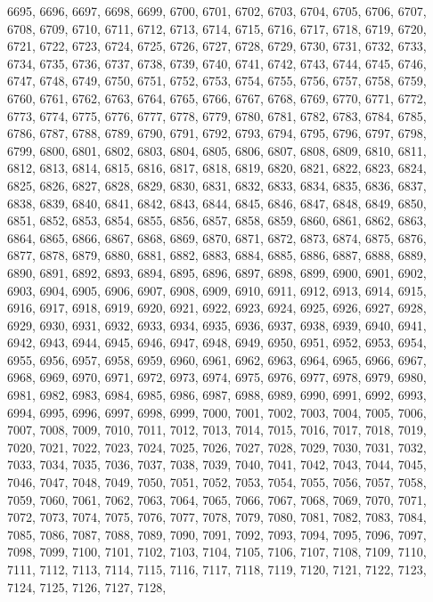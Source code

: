 6695,
6696,
6697,
6698,
6699,
6700,
6701,
6702,
6703,
6704,
6705,
6706,
6707,
6708,
6709,
6710,
6711,
6712,
6713,
6714,
6715,
6716,
6717,
6718,
6719,
6720,
6721,
6722,
6723,
6724,
6725,
6726,
6727,
6728,
6729,
6730,
6731,
6732,
6733,
6734,
6735,
6736,
6737,
6738,
6739,
6740,
6741,
6742,
6743,
6744,
6745,
6746,
6747,
6748,
6749,
6750,
6751,
6752,
6753,
6754,
6755,
6756,
6757,
6758,
6759,
6760,
6761,
6762,
6763,
6764,
6765,
6766,
6767,
6768,
6769,
6770,
6771,
6772,
6773,
6774,
6775,
6776,
6777,
6778,
6779,
6780,
6781,
6782,
6783,
6784,
6785,
6786,
6787,
6788,
6789,
6790,
6791,
6792,
6793,
6794,
6795,
6796,
6797,
6798,
6799,
6800,
6801,
6802,
6803,
6804,
6805,
6806,
6807,
6808,
6809,
6810,
6811,
6812,
6813,
6814,
6815,
6816,
6817,
6818,
6819,
6820,
6821,
6822,
6823,
6824,
6825,
6826,
6827,
6828,
6829,
6830,
6831,
6832,
6833,
6834,
6835,
6836,
6837,
6838,
6839,
6840,
6841,
6842,
6843,
6844,
6845,
6846,
6847,
6848,
6849,
6850,
6851,
6852,
6853,
6854,
6855,
6856,
6857,
6858,
6859,
6860,
6861,
6862,
6863,
6864,
6865,
6866,
6867,
6868,
6869,
6870,
6871,
6872,
6873,
6874,
6875,
6876,
6877,
6878,
6879,
6880,
6881,
6882,
6883,
6884,
6885,
6886,
6887,
6888,
6889,
6890,
6891,
6892,
6893,
6894,
6895,
6896,
6897,
6898,
6899,
6900,
6901,
6902,
6903,
6904,
6905,
6906,
6907,
6908,
6909,
6910,
6911,
6912,
6913,
6914,
6915,
6916,
6917,
6918,
6919,
6920,
6921,
6922,
6923,
6924,
6925,
6926,
6927,
6928,
6929,
6930,
6931,
6932,
6933,
6934,
6935,
6936,
6937,
6938,
6939,
6940,
6941,
6942,
6943,
6944,
6945,
6946,
6947,
6948,
6949,
6950,
6951,
6952,
6953,
6954,
6955,
6956,
6957,
6958,
6959,
6960,
6961,
6962,
6963,
6964,
6965,
6966,
6967,
6968,
6969,
6970,
6971,
6972,
6973,
6974,
6975,
6976,
6977,
6978,
6979,
6980,
6981,
6982,
6983,
6984,
6985,
6986,
6987,
6988,
6989,
6990,
6991,
6992,
6993,
6994,
6995,
6996,
6997,
6998,
6999,
7000,
7001,
7002,
7003,
7004,
7005,
7006,
7007,
7008,
7009,
7010,
7011,
7012,
7013,
7014,
7015,
7016,
7017,
7018,
7019,
7020,
7021,
7022,
7023,
7024,
7025,
7026,
7027,
7028,
7029,
7030,
7031,
7032,
7033,
7034,
7035,
7036,
7037,
7038,
7039,
7040,
7041,
7042,
7043,
7044,
7045,
7046,
7047,
7048,
7049,
7050,
7051,
7052,
7053,
7054,
7055,
7056,
7057,
7058,
7059,
7060,
7061,
7062,
7063,
7064,
7065,
7066,
7067,
7068,
7069,
7070,
7071,
7072,
7073,
7074,
7075,
7076,
7077,
7078,
7079,
7080,
7081,
7082,
7083,
7084,
7085,
7086,
7087,
7088,
7089,
7090,
7091,
7092,
7093,
7094,
7095,
7096,
7097,
7098,
7099,
7100,
7101,
7102,
7103,
7104,
7105,
7106,
7107,
7108,
7109,
7110,
7111,
7112,
7113,
7114,
7115,
7116,
7117,
7118,
7119,
7120,
7121,
7122,
7123,
7124,
7125,
7126,
7127,
7128,
